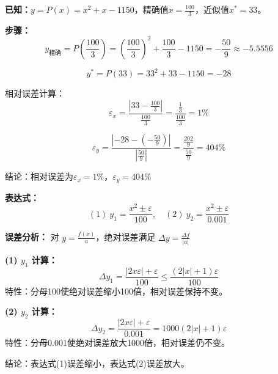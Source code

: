 \documentclass[UTF8]{ctexart}
\begin{document}
\begin{tcolorbox}[colback=green!5!white,colframe=green!75!black,title=6 多项式误差传播分析]
	\textbf{已知：}$y=P(x)=x^2+x-1150$，精确值$x=\frac{100}{3}$，近似值$x^*=33$。
	
	\textbf{步骤：}
	\begin{equation}
	y_{\text{精确}} = P\left(\frac{100}{3}\right) = \left(\frac{100}{3}\right)^2 + \frac{100}{3} -1150 = -\frac{50}{9} \approx-5.5556
	\end{equation}
	
	\begin{equation}
	y^* = P(33) = 33^2 +33 -1150 = -28
	\end{equation}
	
	相对误差计算：
	\begin{equation}
	\varepsilon_x = \frac{|33-\frac{100}{3}|}{\frac{100}{3}} = \frac{\frac{1}{3}}{\frac{100}{3}} = 1\%
	\end{equation}
	
	\begin{equation}
	\varepsilon_y = \frac{|-28-(-\frac{50}{9})|}{\left|\frac{50}{9}\right|} = \frac{\frac{202}{9}}{\frac{50}{9}} = 404\%
	\end{equation}
	
	结论：相对误差为$\varepsilon_x=\boxed{1\%}$，$\varepsilon_y=\boxed{404\%}$
\end{tcolorbox}
\begin{tcolorbox}[colback=green!5!white,colframe=green!75!black,title=问题8 误差传播分析]
	\textbf{表达式：}
	$$
	(1)\ y_1 = \frac{x^2 \pm \varepsilon}{100},\quad (2)\ y_2 = \frac{x^2 \pm \varepsilon}{0.001}
	$$
	
	\textbf{误差分析：}
	对 $ y = \frac{f(x)}{a} $，绝对误差满足 $ \Delta y = \frac{\Delta f}{|a|} $
	
	\textbf{(1) $ y_1 $ 计算：}
	$$
	\Delta y_1 = \frac{|2x \varepsilon| + \varepsilon}{100} \leq \frac{(2|x| +1)\varepsilon}{100}
	$$
	特性：分母100使绝对误差缩小100倍，相对误差保持不变。
	
	\textbf{(2) $ y_2 $ 计算：}
	$$
	\Delta y_2 = \frac{|2x \varepsilon| + \varepsilon}{0.001} = 1000(2|x| +1)\varepsilon
	$$
	特性：分母0.001使绝对误差放大1000倍，相对误差仍不变。
	
	结论：表达式(1)误差缩小，表达式(2)误差放大。
\end{tcolorbox}
\end{document}
